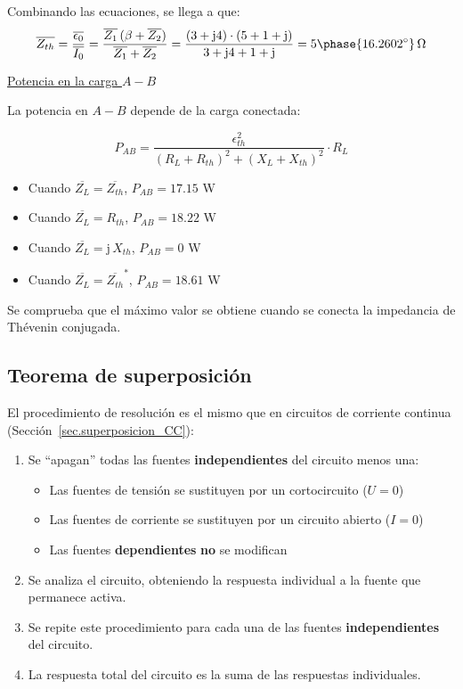\documentclass[11pt]{book} %
\begin{document}
\begin{example}
Combinando las ecuaciones, se llega a que:
\begin{equation*}
  \overline{Z_{th}} = \dfrac{\overline{\epsilon_0}}{\overline{I_0}} = \dfrac{\overline{Z_1}\,(\beta + \overline{Z_2})}{\overline{Z_1}+\overline{Z_2}}=\dfrac{(3+\mathrm{j}4)\cdot (5+1+\mathrm{j})}{3+\mathrm{j}4+1+\mathrm{j}} = 5\phase{16.2602^\circ}\,\Omega
\end{equation*}

\underline{Potencia en la carga $A-B$}

La potencia en $A-B$ depende de la carga conectada:

\begin{equation*}
  P_{AB} = \dfrac{\epsilon_{th}^2}{{(R_L+R_{th})^2+(X_L+X_{th})^2}} \cdot R_L
\end{equation*}

\begin{itemize}
\item Cuando $\overline{Z_L} = \overline{Z_{th}}$, $P_{AB} = {17.15}$ W
\item Cuando $\overline{Z_L} = R_{th}$, $P_{AB} = {18.22}$ W
\item Cuando $\overline{Z_L} = \mathrm{j}\,X_{th}$, $P_{AB} = {0}$ W
\item Cuando $\overline{Z_L} = \overline{Z_{th}}^*$, $P_{AB} = {18.61}$ W
\end{itemize}

Se comprueba que el máximo valor se obtiene cuando se conecta la impedancia de Thévenin conjugada.

    \end{example}
	
	\subsection{Teorema de superposición}
	
	El procedimiento de resolución es el mismo que en circuitos de corriente continua (Sección~\ref{sec.superposicion_CC}):
	\begin{enumerate}
\item Se ``apagan'' todas las fuentes \textbf{independientes} del circuito menos una:
    \begin{itemize}
    \item Las fuentes de tensión se sustituyen por un cortocircuito ($U = 0$)
    \item Las fuentes de corriente se sustituyen por un circuito abierto ($I = 0$)
    \item Las fuentes \textbf{dependientes} \textbf{no} se modifican
    \end{itemize}
\item Se analiza el circuito, obteniendo la respuesta individual a la fuente que permanece activa.
\item Se repite este procedimiento para cada una de las fuentes \textbf{independientes} del circuito.
\item La respuesta total del circuito es la suma de las respuestas individuales.
\end{enumerate}
	
\end{document}
